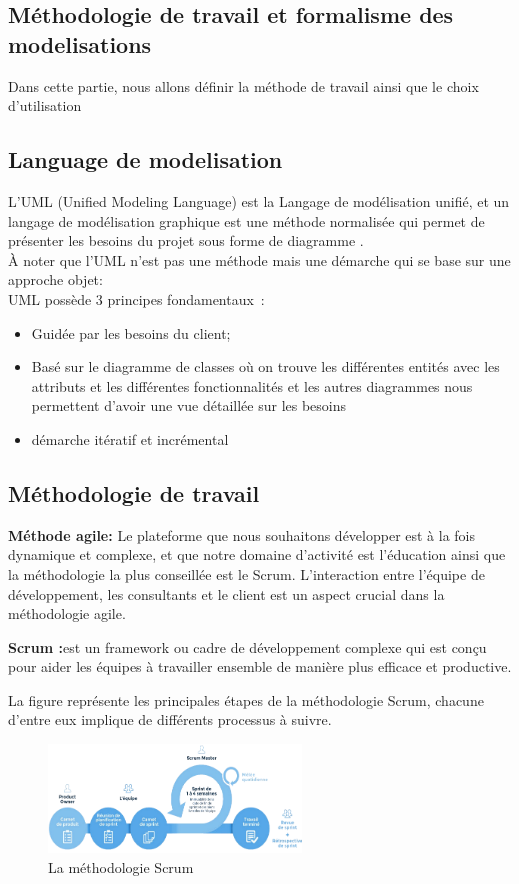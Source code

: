 \begin{itemize}
\section{Méthodologie de travail et formalisme des modelisations}
Dans cette partie, nous allons définir la méthode de travail ainsi que le choix d'utilisation
\subsection{Language de modelisation}
L'UML (Unified Modeling Language) est la  Langage de modélisation unifié, et un langage de modélisation graphique est une méthode normalisée qui permet de présenter les besoins du projet sous forme de diagramme .
\\À noter que l'UML n'est pas une méthode mais une démarche qui se base sur une approche objet:
\\UML possède 3 principes fondamentaux :
\begin{itemize}
\item Guidée par les besoins du client;
\item Basé sur le diagramme de classes où on trouve les différentes entités avec les
attributs et les différentes fonctionnalités et les autres diagrammes nous permettent
d’avoir une vue détaillée sur les besoins
\item démarche itératif et incrémental
\end{itemize}
\subsection{Méthodologie de travail}
{\bf{Méthode agile:}}
Le plateforme que nous souhaitons développer est à la fois dynamique et complexe, et que notre domaine d'activité est l'éducation ainsi que  la méthodologie la plus conseillée est le Scrum.
L'interaction entre l'équipe de développement, les consultants et le client est un aspect crucial dans la méthodologie agile.

\vspace{8mm}

{\bf{ Scrum :}}est un framework ou cadre de développement complexe qui est conçu pour aider les équipes à travailler ensemble de manière plus efficace et productive.

La figure représente les principales étapes de la méthodologie Scrum, chacune d'entre eux implique de différents processus à suivre.
\begin{figure}[H]%
    \center%
    \includegraphics[width=0.6\textwidth]{pages/images/scrum.png}
    \caption{La méthodologie Scrum}\label{fig:test}%
  \end{figure}


\end{itemize}
